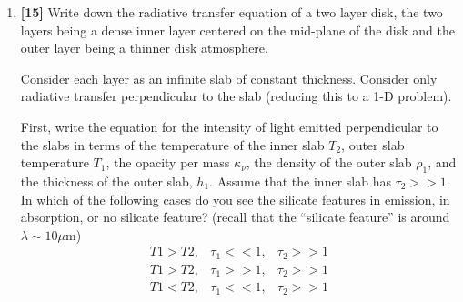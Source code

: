 \documentclass{article}
\begin{document}
\begin{enumerate}
\begin{enumerate}
            \begin{equation}
                F_\nu = \frac{2 \pi \cos\theta}{d^2} \int_{R_{min}}^{R_{max}} B_\nu(T(r)) r dr
            \end{equation}

            to determine $F_\nu$ in terms of constants of the system ($T_0$,
            $R_0$, $\cos \theta$) and $\nu$.  In this equation, $d$ is the
            distance to the object, $R_{inner}$ and $R_{outer}$ are the inner
            \& outer disk radii, and $B(T)$ is the Planck function.  


            You can solve this by changing variables and coming up with an
            integral whose value you may not be able to evaluate, but which is
            independent of frequency (and therefore can be treated as a constant).

        \item \textbf{[5]}
         Determine the spectral index $\alpha_{IR}$ as a function of the power-law index $q$.
            What is $\alpha_{IR}$ for a passively-heated flat disk, where $T\propto r^{-3/4}$?


    \end{enumerate}

    \item \textbf{[15]}
        Write down the radiative transfer equation of a two layer disk, the two
        layers being a dense inner layer centered on the mid-plane of the disk
        and the outer layer being a thinner disk atmosphere.

        Consider each
        layer as an infinite slab of constant thickness. Consider only
        radiative transfer perpendicular to the slab (reducing this to a 1-D
        problem).

        First, write the equation for the intensity of light emitted
        perpendicular to the slabs in terms of the temperature of the inner
        slab $T_2$, outer slab temperature $T_1$, the opacity per mass $\kappa_\nu$, the
        density of the outer slab $\rho_1$, and the thickness of the outer slab, $h_1$.
        Assume that the inner slab has $\tau_{2}>>1$.  In which of the following
        cases do you see the silicate features in emission, in absorption, or
        no silicate feature?  (recall that the ``silicate feature'' is around
        $\lambda\sim10\mu\mathrm{m}$)
\begin{eqnarray}
T1 > T2, & \tau_1 << 1, & \tau_2 >> 1\\
T1 > T2, & \tau_1 >> 1, & \tau_2 >> 1\\
T1 < T2, & \tau_1 << 1, & \tau_2 >> 1
\end{eqnarray}



\end{enumerate}
\end{document}
